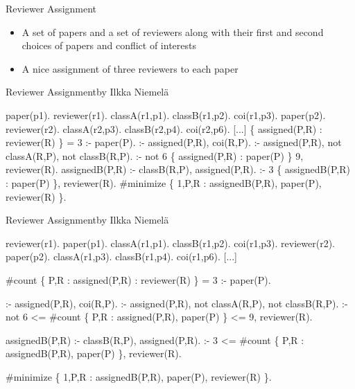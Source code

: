 \begin{frame}{Reviewer Assignment}

  \bigskip

  \begin{itemize}
  \item<1-> 
    A set of papers and a set of reviewers along with their first and second choices of papers and conflict of interests
    \medskip
  \item<1-> 
    A \alert<2>{nice} assignment of three reviewers to each paper
  \end{itemize}

\end{frame}
\begin{frame}[fragile,shrink=1]{Reviewer Assignment}{by Ilkka Niemelä}
\begin{semiverbatim}
paper(p1).  reviewer(r1). classA(r1,p1). classB(r1,p2). coi(r1,p3).
paper(p2).  reviewer(r2). classA(r2,p3). classB(r2,p4). coi(r2,p6).
[...]
\pause
\{ assigned(P,R) : reviewer(R) \} = 3 :-  paper(P).
\pause
 :- assigned(P,R), coi(R,P).
 :- assigned(P,R), not classA(R,P), not classB(R,P).
 :- not 6 \{ assigned(P,R) : paper(P) \} 9, reviewer(R).
\pause
assignedB(P,R) :-  classB(R,P), assigned(P,R).
 :- 3 \{ assignedB(P,R) : paper(P) \}, reviewer(R).
\pause
#minimize \{ 1,P,R : assignedB(P,R), paper(P), reviewer(R) \}.


\end{semiverbatim}
\end{frame}
\begin{frame}[fragile,shrink=1]{Reviewer Assignment}{by Ilkka Niemelä}
\begin{semiverbatim}
reviewer(r1). paper(p1). classA(r1,p1). classB(r1,p2). coi(r1,p3).
reviewer(r2). paper(p2). classA(r1,p3). classB(r1,p4). coi(r1,p6).
[...]

\alert<2>{#count} \{ \alert<2>{P,R :} assigned(P,R) \alert<2>{:} reviewer(R) \} = 3 :-  paper(P).

 :- assigned(P,R), coi(R,P).
 :- assigned(P,R), not classA(R,P), not classB(R,P).
 :- not 6 \alert<2>{<= #count} \{ \alert<2>{P,R :} assigned(P,R)\alert<2>{,} paper(P) \} \alert<2>{<= 9}, reviewer(R).

assignedB(P,R) :-  classB(R,P), assigned(P,R).
 :- 3 \alert<2>{<= #count} \{ \alert<2>{P,R :} assignedB(P,R), paper(P) \}, reviewer(R).

#minimize \{ 1,P,R : assignedB(P,R), paper(P), reviewer(R) \}.


\end{semiverbatim}
\end{frame}
%
